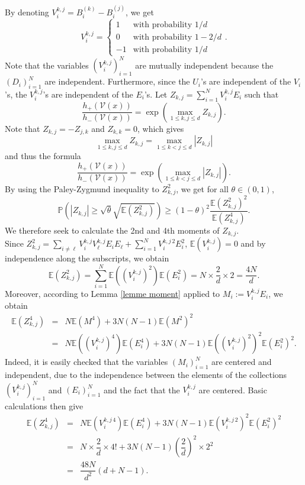 \documentclass[paper=a4, fontsize=11pt]{scrartcl}
\newcommand{\PP}{\mathbb{P}}
\begin{document}
By denoting $V_i^{k,j} = B_i^{(k)} - B_i^{(j)}$, we get
\[V_i^{k,j} = \begin{cases} 
1 & \text{with probability } 1/d \\
0 & \text{with probability } 1 - 2/d \\
-1 & \text{with probability } 1/d 
\end{cases}.\]
Note that the variables \((V_i^{k,j})_{i=1}^N\) are mutually independent because the \((D_i)_{i=1}^N\) are independent. Furthermore, since the \(U_i\)'s are independent of the \(V_i\)'s, the \(V_i^{k,j}\)'s are independent of the \(E_i\)'s.
Let \(Z_{k,j} = \sum_{i=1}^{N} V_i^{k,j} E_i\) such that
\[
\frac{h_+(\mathcal V (x) )}{h_-(\mathcal V (x) )} = \exp \left( \max_{1 \leq k,j \leq d} Z_{k,j} \right).
\]
Note that \(Z_{k,j} = - Z_{j,k}\) and \(Z_{k,k} = 0\), which gives
\[
\max_{1 \leq k,j \leq d} Z_{k,j} = \max_{1 \leq k < j \leq d} | Z_{k,j} |
\]
and thus the formula 
\[
\frac{h_+(\mathcal V (x) )}{h_-(\mathcal V (x) )} = \exp \left( \max_{1 \leq k < j \leq d} | Z_{k,j} | \right).
\]
By using the Paley-Zygmund inequality to $Z_{k,j}^2$, we get for all $\theta \in (0,1)$,
\[
\PP\left(|Z_{k,j}| \geq \sqrt{\theta} \sqrt{\mathbb{E}(Z_{k,j}^2)} \right) \geq (1-\theta)^2 \frac{\mathbb{E}(Z_{k,j}^2)^2}{\mathbb{E}(Z_{k,j}^4)}.
\]
We therefore seek to calculate the 2nd and 4th moments of \(Z_{k,j}\). 
\\ Since \(Z_{k,j}^2 = \sum_{i \neq \ell} V_i^{k,j} V_\ell^{k,j} E_i E_\ell + \sum_{i=1}^N V_i^{k,j \, 2} E_i^2 \), \(\mathbb{E}(V_i^{k,j}) = 0\) and by independence along the subscripts, we obtain 
$$\mathbb E(Z_{k,j}^2) = \sum_{i=1}^N \mathbb{E}((V_i^{k,j})^2) \mathbb{E}(E_i^2) = N \times \frac{2}{d} \times 2 = \frac{4N}{d}.$$
Moreover, according to Lemma \ref{lemme moment} applied to \( M_i := V_i^{k,j} E_i \), we obtain 
\begin{eqnarray*}
    \mathbb{E}(Z_{k,j}^4) &=& N \mathbb{E}(M^4) + 3N (N-1) \mathbb{E}(M^2)^2 \\ &=& N \mathbb{E}((V_i^{k,j})^4) \mathbb{E}(E_i^4) + 3N (N-1) \mathbb{E}((V_i^{k,j})^2)^2 \mathbb{E}(E_i^2)^2.
\end{eqnarray*}
Indeed, it is easily checked that the variables \( (M_i)_{i=1}^N \) are centered and independent, due to the independence between the elements of the collections \( (V_i^{k,j})_{i=1}^N \) and \( (E_i)_{i=1}^N \) and the fact that the $V_i^{k,j}$ are centered. Basic calculations then give
\begin{eqnarray*}
    \mathbb{E}(Z_{k,j}^4) &=& N \mathbb{E}({V_i^{k,j \, 4}}) \mathbb{E}(E_i^4) + 3N (N-1) \mathbb{E}({V_i^{k,j \, 2}})^2 \mathbb{E}(E_i^2)^2 \\ &=& N \times \dfrac{2}{d} \times  4! + 3N(N-1) \left( \dfrac{2}{d}\right)^2 \times 2^2 \\ &=& \dfrac{48N}{d^2} (d+N-1).
\end{eqnarray*}
\end{document}
